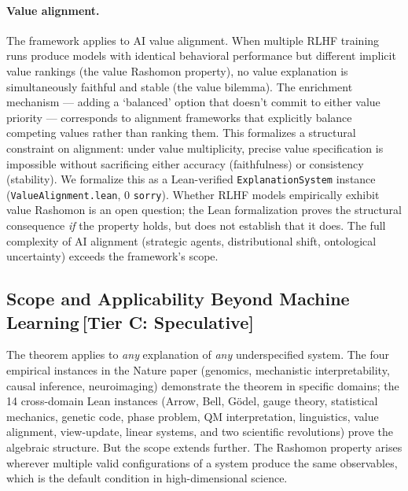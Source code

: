 \documentclass[11pt,a4paper]{article}
\begin{document}
\paragraph{Value alignment.} The framework applies to AI value alignment. When multiple RLHF training runs produce models with identical behavioral performance but different implicit value rankings (the value Rashomon property), no value explanation is simultaneously faithful and stable (the value bilemma). The enrichment mechanism --- adding a `balanced' option that doesn't commit to either value priority --- corresponds to alignment frameworks that explicitly balance competing values rather than ranking them. This formalizes a structural constraint on alignment: under value multiplicity, precise value specification is impossible without sacrificing either accuracy (faithfulness) or consistency (stability). We formalize this as a Lean-verified \texttt{ExplanationSystem} instance (\texttt{ValueAlignment.lean}, 0 \texttt{sorry}).  Whether RLHF models empirically exhibit value Rashomon is an open question; the Lean formalization proves the structural consequence \emph{if} the property holds, but does not establish that it does.  The full complexity of AI alignment (strategic agents, distributional shift, ontological uncertainty) exceeds the framework's scope.

\subsection{Scope and Applicability Beyond Machine Learning\,\textnormal{\normalsize[Tier C: Speculative]}}
\label{sec:scope}

The theorem applies to \emph{any} explanation of \emph{any} underspecified system.  The four empirical instances in the Nature paper (genomics, mechanistic interpretability, causal inference, neuroimaging) demonstrate the theorem in specific domains; the 14 cross-domain Lean instances (Arrow, Bell, G\"odel, gauge theory, statistical mechanics, genetic code, phase problem, QM interpretation, linguistics, value alignment, view-update, linear systems, and two scientific revolutions) prove the algebraic structure.  But the scope extends further.  The Rashomon property arises wherever multiple valid configurations of a system produce the same observables, which is the default condition in high-dimensional science.
\end{document}
